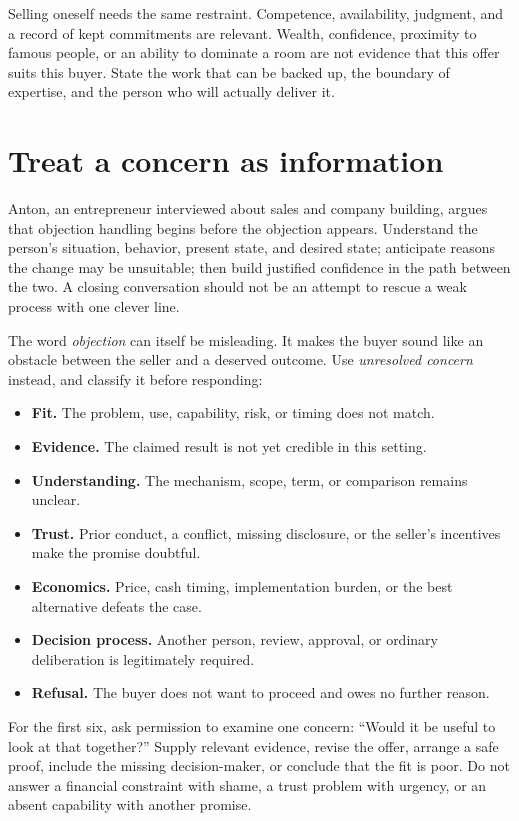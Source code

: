 Selling oneself needs the same restraint. Competence, availability, judgment,
and a record of kept commitments are relevant. Wealth, confidence, proximity
to famous people, or an ability to dominate a room are not evidence that this
offer suits this buyer. State the work that can be backed up, the boundary of
expertise, and the person who will actually deliver it.

\section{Treat a concern as information}

Anton, an entrepreneur interviewed about sales and company building, argues
that objection handling begins before the objection appears. Understand the
person's situation, behavior, present state, and desired state; anticipate
reasons the change may be unsuitable; then build justified confidence in the
path between the two. A closing conversation should not be an attempt to rescue
a weak process with one clever line.

The word \emph{objection} can itself be misleading. It makes the buyer sound
like an obstacle between the seller and a deserved outcome. Use
\emph{unresolved concern} instead, and classify it before responding:

\begin{itemize}[leftmargin=1.5em,itemsep=0.15em]
\item \textbf{Fit.} The problem, use, capability, risk, or timing does not match.
\item \textbf{Evidence.} The claimed result is not yet credible in this setting.
\item \textbf{Understanding.} The mechanism, scope, term, or comparison remains
  unclear.
\item \textbf{Trust.} Prior conduct, a conflict, missing disclosure, or the
  seller's incentives make the promise doubtful.
\item \textbf{Economics.} Price, cash timing, implementation burden, or the best
  alternative defeats the case.
\item \textbf{Decision process.} Another person, review, approval, or ordinary
  deliberation is legitimately required.
\item \textbf{Refusal.} The buyer does not want to proceed and owes no further
  reason.
\end{itemize}

For the first six, ask permission to examine one concern: ``Would it be useful
to look at that together?'' Supply relevant evidence, revise the offer, arrange
a safe proof, include the missing decision-maker, or conclude that the fit is
poor. Do not answer a financial constraint with shame, a trust problem with
urgency, or an absent capability with another promise.

